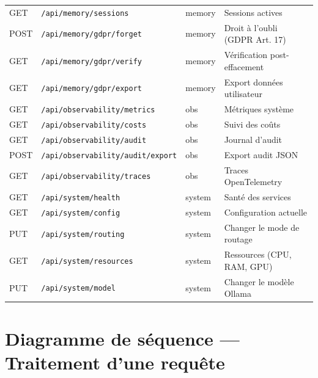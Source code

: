 \documentclass[12pt, a4paper]{article}
\begin{document}
\begin{table}[H]
\begin{tabularx}{\textwidth}{l l l X}
GET & \texttt{/api/memory/sessions} & memory & Sessions actives \\
POST & \texttt{/api/memory/gdpr/forget} & memory & Droit à l'oubli (GDPR Art. 17) \\
GET & \texttt{/api/memory/gdpr/verify} & memory & Vérification post-effacement \\
GET & \texttt{/api/memory/gdpr/export} & memory & Export données utilisateur \\
\midrule
GET & \texttt{/api/observability/metrics} & obs & Métriques système \\
GET & \texttt{/api/observability/costs} & obs & Suivi des coûts \\
GET & \texttt{/api/observability/audit} & obs & Journal d'audit \\
POST & \texttt{/api/observability/audit/export} & obs & Export audit JSON \\
GET & \texttt{/api/observability/traces} & obs & Traces OpenTelemetry \\
\midrule
GET & \texttt{/api/system/health} & system & Santé des services \\
GET & \texttt{/api/system/config} & system & Configuration actuelle \\
PUT & \texttt{/api/system/routing} & system & Changer le mode de routage \\
GET & \texttt{/api/system/resources} & system & Ressources (CPU, RAM, GPU) \\
PUT & \texttt{/api/system/model} & system & Changer le modèle Ollama \\
\bottomrule
\end{tabularx}
\end{table}


\section{Diagramme de séquence — Traitement d'une requête}
\label{app:sequence}
\end{document}
